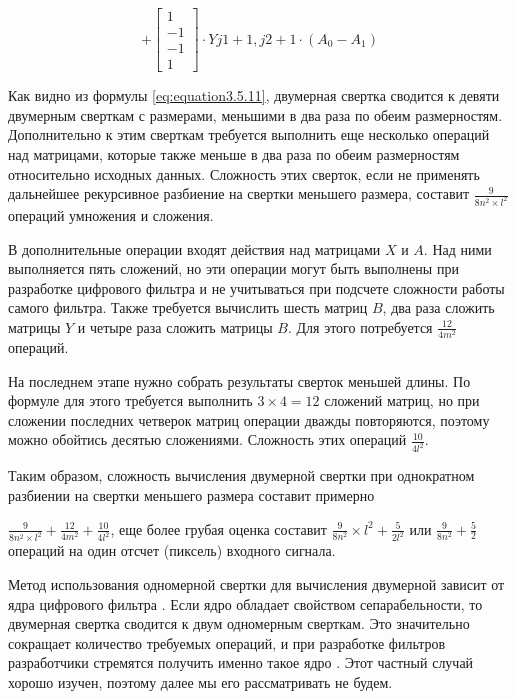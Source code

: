 \begin{equation}
\label{eq:equation3.5.13}
+
\begin{bmatrix}
1 \\ -1 \\ -1 \\ 1
\end{bmatrix}
\cdot
Y{j1+1,j2+1}
\cdot
(A_0 - A_1)
\end{equation}

Как видно из формулы \ref{eq:equation3.5.11}, двумерная свертка сводится к девяти двумерным сверткам с размерами, меньшими в два раза по обеим размерностям.
Дополнительно к этим сверткам требуется выполнить еще несколько операций над матрицами, которые также меньше в два раза по обеим размерностям относительно исходных данных. Сложность этих сверток, если не применять дальнейшее рекурсивное разбиение на свертки меньшего размера, составит $\frac{9}{8n^2 × l^2}$ операций умножения и сложения.

В дополнительные операции входят действия над матрицами $X$ и $A$. Над ними выполняется пять сложений, но эти операции могут быть выполнены при разработке цифрового фильтра и не учитываться при подсчете сложности работы самого фильтра.
Также требуется вычислить шесть матриц $B$, два раза сложить матрицы
$Y$ и четыре раза сложить матрицы $B$. Для этого потребуется $\frac{12}{4m^2}$ операций.

На последнем этапе нужно собрать результаты сверток меньшей длины. По формуле для этого требуется выполнить $3 \times 4 = 12$ сложений матриц, но при сложении последних четверок матриц операции дважды повторяются, поэтому можно обойтись десятью сложениями. Сложность этих операций $\frac{10 }{4l^2}$.

Таким образом, сложность вычисления двумерной свертки при однократном разбиении на свертки меньшего размера составит примерно

$ \frac{9}{8n^2 \times l^2} + \frac{12}{4m^2} + \frac{10}{4l^2}$, еще более грубая оценка составит 
$\frac{9}{8n^2} \times l^2 + \frac{5}{2l^2}$ или $\frac{9}{8n^2} + \frac{5}{2}$ операций на один отсчет (пиксель) входного сигнала.

Метод использования одномерной свертки для вычисления двумерной зависит от ядра цифрового фильтра \cite{Digital_processing_Goldenberg_1985, gruzman2002digital}. 
Если ядро обладает свойством сепарабельности, то двумерная свертка сводится к двум одномерным сверткам. Это значительно сокращает количество требуемых операций, и при разработке фильтров разработчики стремятся получить именно такое ядро \cite{Huang1984fast}.
Этот частный случай хорошо изучен, поэтому далее мы его рассматривать не
будем.


